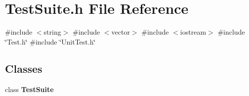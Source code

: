 \section{Test\+Suite.\+h File Reference}
\label{TestSuite_8h}
{\ttfamily \#include $<$string$>$}\newline
{\ttfamily \#include $<$vector$>$}\newline
{\ttfamily \#include $<$iostream$>$}\newline
{\ttfamily \#include \char`\"{}Test.\+h\char`\"{}}\newline
{\ttfamily \#include \char`\"{}Unit\+Test.\+h\char`\"{}}\newline
\subsection*{Classes}
\begin{DoxyCompactItemize}
\item 
class \textbf{ Test\+Suite}
\end{DoxyCompactItemize}
